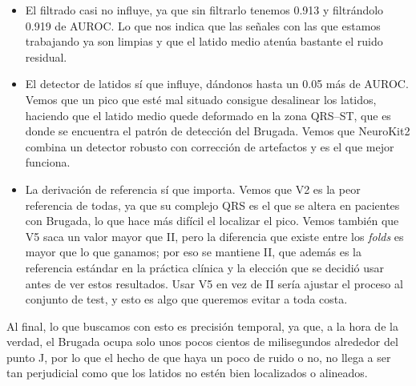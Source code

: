 \begin{itemize}
  \item El filtrado casi no influye, ya que sin filtrarlo tenemos \num{0.913} y filtrándolo \num{0.919} de AUROC. Lo que nos indica que las señales con las que estamos trabajando ya son limpias y que el latido medio atenúa bastante el ruido residual.
  \item El detector de latidos sí que influye, dándonos hasta un \num{0.05} más de AUROC. Vemos que un pico que esté mal situado consigue desalinear los latidos, haciendo que el latido medio quede deformado en la zona QRS--ST, que es donde se encuentra el patrón de detección del Brugada. Vemos que NeuroKit2 combina un detector robusto con corrección de artefactos y es el que mejor funciona.
  \item La derivación de referencia sí que importa. Vemos que V2 es la peor referencia de todas, ya que su complejo QRS es el que se altera en pacientes con Brugada, lo que hace más difícil el localizar el pico. Vemos también que V5 saca un valor mayor que II, pero la diferencia que existe entre los \emph{folds} es mayor que lo que ganamos; por eso se mantiene II, que además es la referencia estándar en la práctica clínica y la elección que se decidió usar antes de ver estos resultados. Usar V5 en vez de II sería ajustar el proceso al conjunto de test, y esto es algo que queremos evitar a toda costa.
\end{itemize}

Al final, lo que buscamos con esto es precisión temporal, ya que, a la hora de la verdad, el Brugada ocupa solo unos pocos cientos de milisegundos alrededor del punto J, por lo que el hecho de que haya un poco de ruido o no, no llega a ser tan perjudicial como que los latidos no estén bien localizados o alineados.
